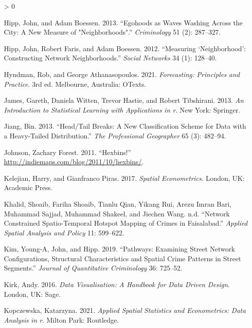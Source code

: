 \documentclass[
  krantz2]{krantz}
\newlength{\cslhangindent}
\newenvironment{CSLReferences}[2] %
 {%
  \setlength{\parindent}{0pt}
  \ifodd #1 \everypar{\setlength{\hangindent}{\cslhangindent}}\ignorespaces\fi
  \ifnum #2 > 0
  \setlength{\parskip}{#2\baselineskip}
  \fi
 }%
 {}
\begin{document}
\begin{CSLReferences}{1}{0}
\leavevmode\hypertarget{ref-Hipp_2013}{}%
Hipp, John, and Adam Boessen. 2013. {``Egohoods as Waves Washing Across the City: A New Measure of "Neighborhoods".''} \emph{Criminology} 51 (2): 287--327.

\leavevmode\hypertarget{ref-Hipp_2012}{}%
Hipp, John, Robert Faris, and Adam Boessen. 2012. {``Measuring {`Neighborhood'}: Constructing Network Neighborhoods.''} \emph{Social Networks} 34 (1): 128--40.

\leavevmode\hypertarget{ref-Hyndman_2021}{}%
Hyndman, Rob, and George Athanasopoulos. 2021. \emph{Forecasting: Principles and Practice}. 3rd ed. Melbourne, Australia: OTexts.

\leavevmode\hypertarget{ref-James_2013}{}%
James, Gareth, Daniela Witten, Trevor Hastie, and Robert Tibshirani. 2013. \emph{An Introduction to Statistical Learning with Applications in r}. New York: Springer.

\leavevmode\hypertarget{ref-Jiang_2013}{}%
Jiang, Bin. 2013. {``Head/Tail Breaks: A New Classification Scheme for Data with a Heavy-Tailed Distribution.''} \emph{The Professional Geographer} 65 (3): 482--94.

\leavevmode\hypertarget{ref-Johnson_2011}{}%
Johnson, Zachary Forest. 2011. {``Hexbins!''} \url{http://indiemaps.com/blog/2011/10/hexbins/}.

\leavevmode\hypertarget{ref-Kelejian_2017}{}%
Kelejian, Harry, and Gianfranco Piras. 2017. \emph{Spatial Econometrics}. London, UK: Academic Press.

\leavevmode\hypertarget{ref-Khalid_2018}{}%
Khalid, Shoaib, Fariha Shoaib, Tianlu Qian, Yikang Rui, Arezu Imran Bari, Muhammad Sajjad, Muhammad Shakeel, and Jiechen Wang. n.d. {``Network Constrained Spatio-Temporal Hotspot Mapping of Crimes in Faisalabad.''} \emph{Applied Spatial Analysis and Policy} 11: 599--622.

\leavevmode\hypertarget{ref-Kim_2019}{}%
Kim, Young‑A, John, and Hipp. 2019. {``Pathways: Examining Street Network Configurations, Structural Characteristics and Spatial Crime Patterns in Street Segments.''} \emph{Journal of Quantitative Criminology} 36: 725--52.

\leavevmode\hypertarget{ref-Kirk_2016}{}%
Kirk, Andy. 2016. \emph{Data Visualisation: A Handbook for Data Driven Design}. London, UK: Sage.

\leavevmode\hypertarget{ref-Kopczewska_2021}{}%
Kopczewska, Katarzyna. 2021. \emph{Applied Spatial Statistics and Econometrics: Data Analysis in r}. Milton Park: Routledge.


\end{CSLReferences}
\end{document}
